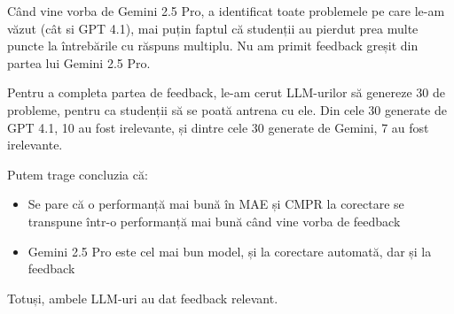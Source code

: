 \documentclass[12pt, a4paper]{report}
\begin{document}
Când vine vorba de Gemini 2.5 Pro, a identificat toate problemele pe care le-am văzut (cât si GPT 4.1), mai puțin faptul că studenții au pierdut prea multe puncte la întrebările cu răspuns multiplu.
Nu am primit feedback greșit din partea lui Gemini 2.5 Pro.

Pentru a completa partea de feedback,
le-am cerut LLM-urilor să genereze 30 de probleme,
pentru ca studenții să se poată antrena cu ele.
Din cele 30 generate de GPT 4.1, 10 au fost irelevante, și dintre cele 30 generate de Gemini, 7 au fost irelevante.

Putem trage concluzia că:
\begin{itemize}
\item Se pare că o performanță mai bună în MAE și CMPR la corectare
se transpune într-o performanță mai bună când vine vorba de feedback
\item Gemini 2.5 Pro este cel mai bun model, și la corectare automată, dar și la feedback
\end{itemize}

Totuși, ambele LLM-uri au dat feedback relevant.


\printbibliography[heading=bibintoc]
\end{document}
